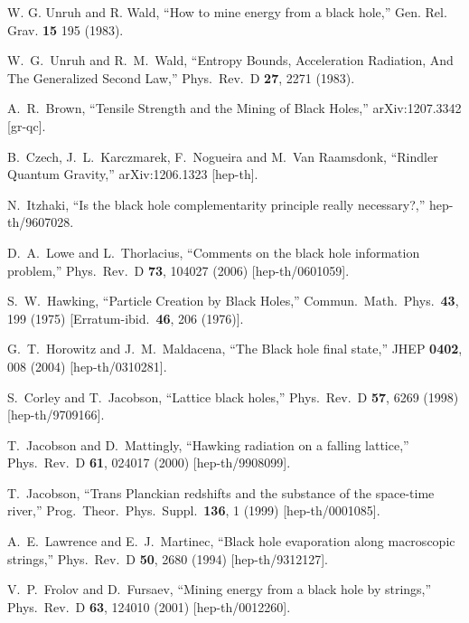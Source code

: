 \documentclass[12pt]{article}
\begin{document}
\begin{thebibliography}{99}
W. G. Unruh and R. Wald,
``How to mine energy from a black hole,''
Gen. Rel. Grav. {\bf 15} 195 (1983).

  W.~G.~Unruh and R.~M.~Wald,
  ``Entropy Bounds, Acceleration Radiation, And The Generalized Second Law,''
  Phys.\ Rev.\ D {\bf 27}, 2271 (1983).

  A.~R.~Brown,
  ``Tensile Strength and the Mining of Black Holes,''
  arXiv:1207.3342 [gr-qc].

  B.~Czech, J.~L.~Karczmarek, F.~Nogueira and M.~Van Raamsdonk,
  ``Rindler Quantum Gravity,''
  arXiv:1206.1323 [hep-th].

  N.~Itzhaki,
  ``Is the black hole complementarity principle really necessary?,''
  hep-th/9607028.

  D.~A.~Lowe and L.~Thorlacius,
  ``Comments on the black hole information problem,''
  Phys.\ Rev.\ D {\bf 73}, 104027 (2006)
  [hep-th/0601059].

  S.~W.~Hawking,
  ``Particle Creation by Black Holes,''
  Commun.\ Math.\ Phys.\  {\bf 43}, 199 (1975)
  [Erratum-ibid.\  {\bf 46}, 206 (1976)].

  G.~T.~Horowitz and J.~M.~Maldacena,
  ``The Black hole final state,''
  JHEP {\bf 0402}, 008 (2004)
  [hep-th/0310281].

 S.~Corley and T.~Jacobson,
  ``Lattice black holes,''
  Phys.\ Rev.\ D {\bf 57}, 6269 (1998)
  [hep-th/9709166].

    T.~Jacobson and D.~Mattingly,
  ``Hawking radiation on a falling lattice,''
  Phys.\ Rev.\ D {\bf 61}, 024017 (2000)
  [hep-th/9908099].

    T.~Jacobson,
  ``Trans Planckian redshifts and the substance of the space-time river,''
  Prog.\ Theor.\ Phys.\ Suppl.\  {\bf 136}, 1 (1999)
  [hep-th/0001085].

  A.~E.~Lawrence and E.~J.~Martinec,
  ``Black hole evaporation along macroscopic strings,''
  Phys.\ Rev.\ D {\bf 50}, 2680 (1994)
  [hep-th/9312127].

  V.~P.~Frolov and D.~Fursaev,
  ``Mining energy from a black hole by strings,''
  Phys.\ Rev.\ D {\bf 63}, 124010 (2001)
  [hep-th/0012260].


\end{thebibliography}
\end{document}

